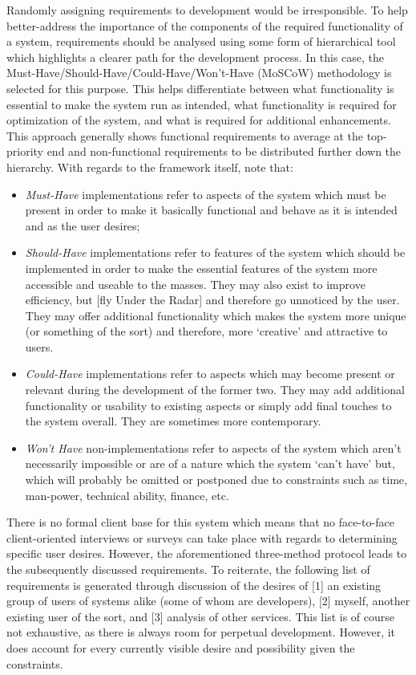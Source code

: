 \documentclass[11pt, english]{article}
\begin{document}
	Randomly assigning requirements to development would be irresponsible. To help better-address the importance of the components of the required functionality of a system, requirements should be analysed using some form of hierarchical tool which highlights a clearer path for the development process. In this case, the Must-Have/Should-Have/Could-Have/Won't-Have (MoSCoW) methodology is selected for this purpose. This helps differentiate between what functionality is essential to make the system run as intended, what functionality is required for optimization of the system, and what is required for additional enhancements. This approach generally shows functional requirements to average at the top-priority end and non-functional requirements to be distributed further down the hierarchy. With regards to the framework itself, note that:

	\begin{itemize}
	\setlength\itemsep{0cm}
		\item \textit{Must-Have} implementations refer to aspects of the system which must be present in order to make it basically functional and behave as it is intended and as the user desires;
		\item \textit{Should-Have} implementations refer to features of the system which should be implemented in order to make the essential features of the system more accessible and useable to the masses. They may also exist to improve efficiency, but [fly Under the Radar] and therefore go unnoticed by the user. They may offer additional functionality which makes the system more unique (or something of the sort) and therefore, more `creative' and attractive to users.
		\item \textit{Could-Have} implementations refer to aspects which may become present or relevant during the development of the former two. They may add additional functionality or usability to existing aspects or simply add final touches to the system overall. They are sometimes more contemporary.
		\item \textit{Won't Have} non-implementations refer to aspects of the system which aren't necessarily impossible or are of a nature which the system `can't have' but, which will probably be omitted or postponed due to constraints such as time, man-power, technical ability, finance, etc.
	\end{itemize}

	There is no formal client base for this system which means that no face-to-face client-oriented interviews or surveys can take place with regards to determining specific user desires. However, the aforementioned three-method protocol leads to the subsequently discussed requirements. To reiterate, the following list of requirements is generated through discussion of the desires of [1] an existing group of users of systems alike (some of whom are developers), [2] myself, another existing user of the sort, and [3] analysis of other services. This list is of course not exhaustive, as there is always room for perpetual development. However, it does account for every currently visible desire and possibility given the constraints.
\end{document}
